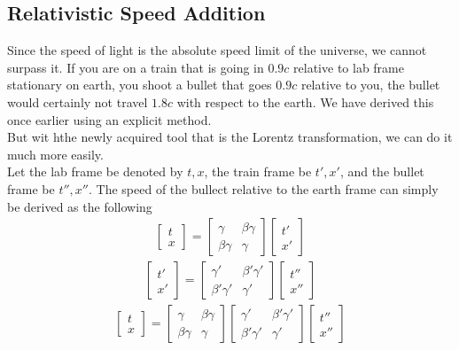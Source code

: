 \documentclass[12pt]{book}
\begin{document}
\subsection{Relativistic Speed Addition}
Since the speed of light is the absolute speed limit of the universe, we cannot surpass it. If you are on a train that is going in $0.9c$ relative to lab frame stationary on earth, you shoot a bullet that goes $0.9c$ relative to you, the bullet would certainly not travel $1.8c$ with respect to the earth. We have derived this once earlier using an explicit method.\\
\newline
But wit hthe newly acquired tool that is the Lorentz transformation, we can do it much more easily.\\
\newline
Let the lab frame be denoted by $t,x$, the train frame be $t',x'$, and the bullet frame be $t'', x''$. The speed of the bullect relative to the earth frame can simply be derived as the following
\begin{align}
\begin{bmatrix}
    t \\ x
\end{bmatrix}
=
\begin{bmatrix}
    \gamma      &   \beta\gamma   \\
    \beta\gamma &   \gamma
\end{bmatrix}
\begin{bmatrix}
    t'\\ x'
\end{bmatrix}
\end{align}
\begin{align}
\begin{bmatrix}
    t' \\ x'
\end{bmatrix}
=
\begin{bmatrix}
    \gamma'      &   \beta'\gamma'   \\
    \beta'\gamma' &   \gamma'
\end{bmatrix}
\begin{bmatrix}
    t''\\ x''
\end{bmatrix}
\end{align}
\begin{align}
\begin{bmatrix}
    t\\ x
\end{bmatrix}
=
\begin{bmatrix}
    \gamma      &   \beta\gamma   \\
    \beta\gamma &   \gamma
\end{bmatrix}
\begin{bmatrix}
    \gamma'      &   \beta'\gamma'   \\
    \beta'\gamma' &   \gamma'
\end{bmatrix}
\begin{bmatrix}
    t''\\ x''
\end{bmatrix}
\end{align}
\end{document}
